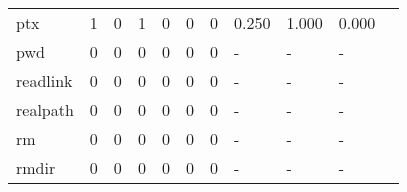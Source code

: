 \begin{longtable}{lp{1.2cm}p{1.2cm}p{1.2cm}p{1.2cm}p{1.2cm}p{1.2cm}p{1.2cm}p{1.2cm}p{1.2cm}p{1.2cm}}
ptx       &                                     1 &                                                  0 &                                                  1 &                                                  0 &                                                  0 &                                                  0 &                                         0.250 &                                              1.000 &                                              0.000 \\
pwd       &                                     0 &                                                  0 &                                                  0 &                                                  0 &                                                  0 &                                                  0 &                                             - &                                                  - &                                                  - \\
readlink  &                                     0 &                                                  0 &                                                  0 &                                                  0 &                                                  0 &                                                  0 &                                             - &                                                  - &                                                  - \\
realpath  &                                     0 &                                                  0 &                                                  0 &                                                  0 &                                                  0 &                                                  0 &                                             - &                                                  - &                                                  - \\
rm        &                                     0 &                                                  0 &                                                  0 &                                                  0 &                                                  0 &                                                  0 &                                             - &                                                  - &                                                  - \\
rmdir     &                                     0 &                                                  0 &                                                  0 &                                                  0 &                                                  0 &                                                  0 &                                             - &                                                  - &                                                  - \\

\end{longtable}
